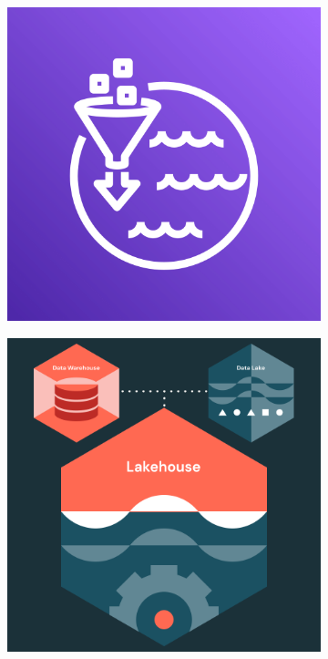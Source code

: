 \begin{figure}[h!]
  \centering
  \begin{subfigure}[b]{0.1\textwidth}
    \includegraphics[width=\textwidth]{Images/awsLakeFormation.png}
    \label{fig:awslakeformation}
  \end{subfigure}
  \hfill
  \begin{subfigure}[b]{0.1\textwidth}
    \includegraphics[width=\textwidth]{Images/LP-headerImage-lakehouse-architecture-2x.png}

\end{subfigure}
\end{figure}
